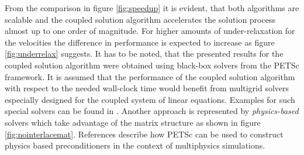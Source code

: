 From the comparison in figure \ref{fig:speedup} it is evident, that both algorithms are scalable and the coupled solution algorithm accelerates the solution process almost up to one order of magnitude. For higher amounts of under-relaxation for the velocities the difference in performance is expected to increase as figure \ref{fig:underrelax} suggests. It has to be noted, that the presented results for the coupled solution algorithm were obtained using black-box solvers from the PETSc framework. It is assumed that the performance of the coupled solution algorithm with respect to the needed wall-clock time would benefit from multigrid solvers especially designed for the coupled system of linear equations. Examples for such special solvers can be found in \cite{darwish09,klaij13,mangani14}. Another approach is represented by \emph{physics-based} solvers which take advantage of the matrix structure as shown in figure \ref{fig:nointerlacemat}. References \cite{brown12,mcinnes14} describe how PETSc can be used to construct physics based preconditioners in the context of multiphysics simulations.


